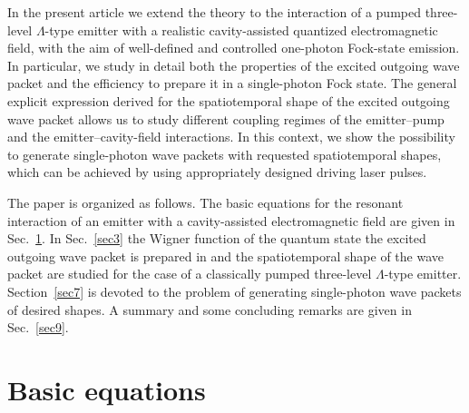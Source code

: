 \documentclass[pra, twocolumn]{revtex4}
\begin{document}
In the present article we
extend the theory to
the interaction of a pumped three-level
$\Lambda$-type emitter with a realistic cavity-assisted
quantized electromagnetic
field, with the aim of
well-defined and controlled
one-photon Fock-state emission.
In particular, we study in detail both the properties of the
excited outgoing wave packet
and the efficiency to prepare it in a single-photon Fock state.
The
general explicit expression
derived
for the spatiotemporal shape
of the excited outgoing wave packet allows us to study different
coupling
regimes of the emitter--pump and the emitter--cavity-field interactions.
%
In this context,
we show the possibility to generate single-photon wave packets
with requested spatiotemporal shapes,
which
can be achieved by
using
appropriately designed
driving laser pulses.

The paper is organized as follows. The basic equations for the
resonant interaction of an emitter with a cavity-assisted
electromagnetic field are given in Sec.~\ref{sec2}. In Sec.~\ref{sec3}
the Wigner function of the quantum state the excited outgoing wave
packet is prepared in and the spatiotemporal shape of the wave packet are studied
for the case of a classically pumped three-level $\Lambda$-type
emitter. Section~\ref{sec7} is devoted to the problem of
generating single-photon wave packets of desired
shapes.
A summary and some concluding remarks are given in Sec.~\ref{sec9}.



\section{Basic equations}
\label{sec2}
\end{document}
